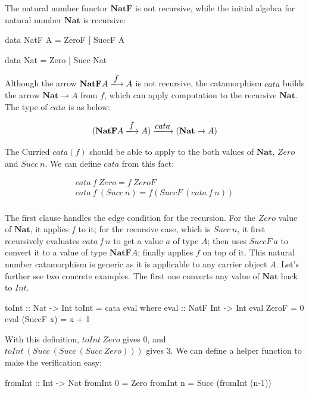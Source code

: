 \documentclass[b5paper]{article}
\begin{document}
The natural number functor $\mathbf{NatF}$ is not recursive, while the initial algebra for natural number $\mathbf{Nat}$ is recursive:

\begin{Haskell}[frame = none]
data NatF A = ZeroF | SuccF A

data Nat = Zero | Succ Nat
\end{Haskell}

Although the arrow $\mathbf{NatF} A \arrowto{f} A$ is not recursive, the catamorphism $cata$ builds the arrow $\mathbf{Nat} \to A$ from $f$, which can apply computation to the recursive $\mathbf{Nat}$. The type of $cata$ is as below:

\[
(\mathbf{NatF} A \arrowto{f} A) \arrowto{cata} (\mathbf{Nat} \to A)
\]

The Curried $cata(f)$ should be able to apply to the both values of $\mathbf{Nat}$, $Zero$ and $Succ\ n$. We can define $cata$ from this fact:

\[
\begin{array}{l}
cata\ f\ Zero = f\ ZeroF \\
cata\ f\ (Succ\ n) = f (SuccF\ (cata\ f\ n)) \\
\end{array}
\]

The first clause handles the edge condition for the recursion. For the $Zero$ value of $\mathbf{Nat}$, it applies $f$ to it; for the recursive case, which is $Succ\ n$, it first recursively evaluates $cata\ f\ n$ to get a value $a$ of type $A$; then uses $SuccF\ a$ to convert it to a value of type $\mathbf{NatF}A$; finally applies $f$ on top of it. This natural number catamorphism is generic as it is applicable to any carrier object $A$. Let's further see two concrete examples. The first one converts any value of $\mathbf{Nat}$ back to $Int$.

\begin{Haskell}
toInt :: Nat -> Int
toInt = cata eval where
  eval :: NatF Int -> Int
  eval ZeroF = 0
  eval (SuccF x) = x + 1
\end{Haskell}

With this definition, $toInt\ Zero$ gives 0, and $toInt\ (Succ\ (Succ\ (Succ\ Zero)))$ gives 3. We can define a helper function to make the verification easy:

\begin{Haskell}
fromInt :: Int -> Nat
fromInt 0 = Zero
fromInt n = Succ (fromInt (n-1))
\end{Haskell}
\end{document}
